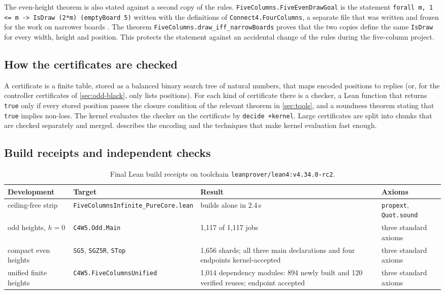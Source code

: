 \documentclass[11pt,a4paper]{article}
\theoremstyle{plain}
\theoremstyle{definition}
\newcommand{\code}[1]{{\upshape\texttt{\small\nolinkurl{#1}}}}
\newcommand{\lst}[1]{{\upshape\frenchspacing\texttt{\small #1}}}
\begin{document}
The even-height theorem is also stated against a second copy of the rules. \code{FiveColumns.FiveEvenDrawGoal} is the statement \lst{forall m, 1 <= m -> IsDraw (2*m) (emptyBoard 5)} written with the definitions of \code{Connect4.FourColumns}, a separate file that was written and frozen for the work on narrower boards \cite{narrow14,fourcol}. The theorem \code{FiveColumns.draw_iff_narrowBoards} proves that the two copies define the same \code{IsDraw} for every width, height and position. This protects the statement against an accidental change of the rules during the five-column project.

\subsection{How the certificates are checked}

A certificate is a finite table, stored as a balanced binary search tree of natural numbers, that maps encoded positions to replies (or, for the controller certificates of \cref{sec:odd-black}, only lists positions). For each kind of certificate there is a checker, a Lean function that returns \code{true} only if every stored position passes the closure condition of the relevant theorem in \cref{sec:tools}, and a soundness theorem stating that \code{true} implies non-loss. The kernel evaluates the checker on the certificate by \code{decide +kernel}. Large certificates are split into chunks that are checked separately and merged.  describes the encoding and the techniques that make kernel evaluation fast enough.

\subsection{Build receipts and independent checks}
\label{sec:receipts}

\begin{table}[!htbp]
\centering
\caption{Final Lean build receipts on toolchain \code{leanprover/lean4:v4.34.0-rc2}.}
\label{tab:receipts}
\footnotesize
\begin{tabularx}{\linewidth}{@{}L{2.35cm} L{4.15cm} Y L{2.6cm}@{}}
\toprule
\textbf{Development} & \textbf{Target} & \textbf{Result} & \textbf{Axioms} \\
\midrule
ceiling-free strip & \code{FiveColumnsInfinite_PureCore.lean} & builds alone in 2.4\,s & \code{propext}, \code{Quot.sound} \\
odd heights, $h=0$ & \code{C4W5.Odd.Main} & 1{,}117 of 1{,}117 jobs & three standard axioms \\
compact even heights & \code{SG5}, \code{SGZ5R}, \code{STop} & 1{,}656 shards; all three main declarations and four endpoints kernel-accepted & three standard axioms \\
unified finite heights & \code{C4W5.FiveColumnsUnified} & 1{,}014 dependency modules: 894 newly built and 120 verified reuses; endpoint accepted & three standard axioms \\
\bottomrule
\end{tabularx}
\end{table}
\end{document}
